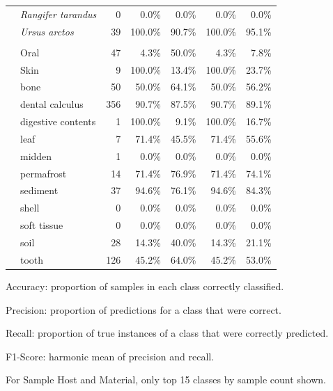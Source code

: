 \begin{table}[!p]
\begin{tabular*}{\columnwidth}{@{\extracolsep{\fill}}llrrrrr@{\extracolsep{\fill}}}
 & \textit{Rangifer tarandus} & 0 & 0.0\% & 0.0\% & 0.0\% & 0.0\% \\
 & \textit{Ursus arctos} & 39 & 100.0\% & 90.7\% & 100.0\% & 95.1\% \\
\addlinespace
\multicolumn{7}{l}{\textbf{Material}} \\
\addlinespace[0.5em]
 & Oral & 47 & 4.3\% & 50.0\% & 4.3\% & 7.8\% \\
 & Skin & 9 & 100.0\% & 13.4\% & 100.0\% & 23.7\% \\
 & bone & 50 & 50.0\% & 64.1\% & 50.0\% & 56.2\% \\
 & dental calculus & 356 & 90.7\% & 87.5\% & 90.7\% & 89.1\% \\
 & digestive contents & 1 & 100.0\% & 9.1\% & 100.0\% & 16.7\% \\
 & leaf & 7 & 71.4\% & 45.5\% & 71.4\% & 55.6\% \\
 & midden & 1 & 0.0\% & 0.0\% & 0.0\% & 0.0\% \\
 & permafrost & 14 & 71.4\% & 76.9\% & 71.4\% & 74.1\% \\
 & sediment & 37 & 94.6\% & 76.1\% & 94.6\% & 84.3\% \\
 & shell & 0 & 0.0\% & 0.0\% & 0.0\% & 0.0\% \\
 & soft tissue & 0 & 0.0\% & 0.0\% & 0.0\% & 0.0\% \\
 & soil & 28 & 14.3\% & 40.0\% & 14.3\% & 21.1\% \\
 & tooth & 126 & 45.2\% & 64.0\% & 45.2\% & 53.0\% \\
\bottomrule
\end{tabular*}
\begin{tablenotes}
\item Accuracy: proportion of samples in each class correctly classified.
\item Precision: proportion of predictions for a class that were correct.
\item Recall: proportion of true instances of a class that were correctly predicted.
\item F1-Score: harmonic mean of precision and recall.
\item For Sample Host and Material, only top 15 classes by sample count shown.
\end{tablenotes}
\end{table}